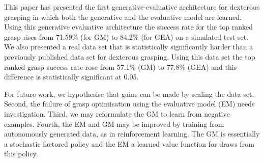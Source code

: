 This paper has presented the first generative-evaluative architecture for dexterous grasping in which both the generative and the evaluative model are learned. Using this generative evaluative architecture the success rate for the top ranked grasp rises from 71.59\% (for GM) to 84.2\% (for GEA) on a simulated test set. We also presented a real data set that is statistically significantly harder than a previously published data set for dexterous grasping. Using this data set the top ranked grasp success rate rose from 57.1\% (GM) to 77.8\% (GEA) and this difference is statistically significant at 0.05.

For future work, we hypothesise that gains can be made by scaling the data set. Second, the failure of grasp optimisation using the evaluative model (EM) needs investigation. Third, we may reformulate the GM to learn from negative examples. Fourth, the EM and GM may be improved by training from autonomously generated data, as in reinforcement learning. The GM is essentially a stochastic factored policy and the EM a learned value function for draws from this policy. 